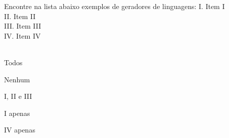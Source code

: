 \question[10]
Encontre na lista abaixo exemplos de geradores de linguagens:
I. Item I\\
II. Item II\\
III. Item III\\
IV. Item IV\\
\\
\begin{choices}
\item Todos
\item Nenhum
\item I, II e III
\item I apenas %
\item IV apenas
\end{choices}
\answerline

